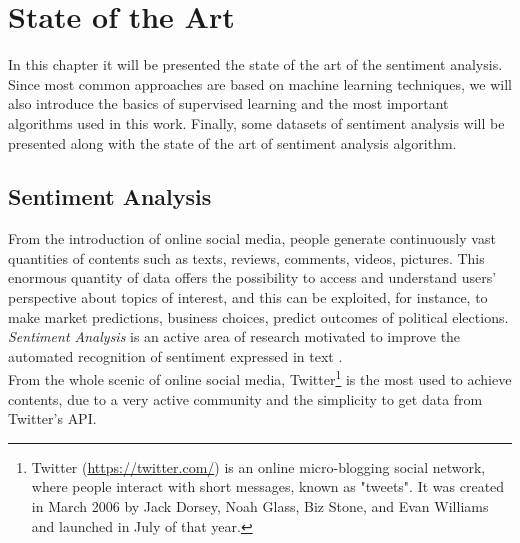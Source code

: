 
\chapter{State of the Art}
\label{state-of-the-art}


In this chapter it will be presented the state of the art of the sentiment analysis. Since most common approaches are based on machine learning techniques, we will also introduce the basics of supervised learning and the most important algorithms used in this work. Finally, some datasets of sentiment analysis will be presented along with the state of the art of sentiment analysis algorithm.


\section{Sentiment Analysis}


From the introduction of online social media, people generate continuously vast quantities of contents such as texts, reviews, comments, videos, pictures. This enormous quantity of data offers the possibility to access and understand users' perspective about topics of interest, and this can be exploited, for instance, to make market predictions, business choices, predict outcomes of political elections. \textit{Sentiment Analysis} is an active area of research motivated to improve the automated recognition of sentiment expressed in text \cite{Zimbra:2018:STS:3210372.3185045}.\\
From the whole scenic of online social media, Twitter\footnote[1]{Twitter (\url{https://twitter.com/}) is an online micro-blogging social network, where people interact with short messages, known as "tweets". It was created in March 2006 by Jack Dorsey, Noah Glass, Biz Stone, and Evan Williams and launched in July of that year.} is the most used to achieve contents, due to a very active community and the simplicity to get data from Twitter's \ac{API}. 
